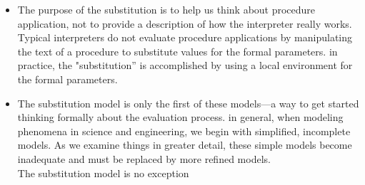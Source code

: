 \documentclass[a4paper,twoside]{article}
\numberwithin{equation}{section}
\begin{document}
\begin{itemize}
    \item The purpose of the substitution is to help us think about procedure \\
          application, not to provide a description of how the interpreter really works.
          Typical interpreters do not evaluate procedure applications by manipulating the text of a
          procedure to
          substitute values for the formal parameters. in practice, the "substitution” is
          accomplished by using a local environment for the formal parameters.
    \item The substitution model is only the first of these
          models—a way to get started thinking formally about the evaluation process.
          in general, when modeling phenomena in science and engineering, we begin with simplified,
          incomplete models. As we examine things in greater detail, these simple models become inadequate and must be
          replaced by more refined models. \\
          The substitution model is no exception
\end{itemize}
\end{document}
